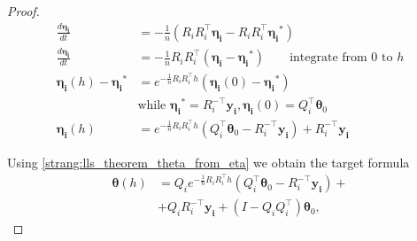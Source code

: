\documentclass{article}
\newcommand{\vect}[1]{\boldsymbol{\mathbf{#1}}}
\begin{document}
\begin{proof}
\begin{align*}
\frac{d \vect{\eta_i}}{d t} &= - \frac{1}{n} \left( R_iR_i^\top \vect{\eta_i}- R_iR_i^\top \vect{\eta_i}^*\right) \\
\frac{d \vect{\eta_i}}{d t} &= - \frac{1}{n} R_iR_i^\top \left( \vect{\eta_i}- \vect{\eta_i}^*\right) \qquad \text{integrate from $0$ to $h$} \\
\vect{\eta_i}(h) - \vect{\eta_i}^* &= e^{- \frac{1}{n} R_iR_i^\top h} (\vect{\eta_i}(0) - \vect{\eta_i}^*) \\ 
&\text{while } \vect{\eta_i}^* = R_i^{-\top}\vect{y_i}, \vect{\eta_i}(0) = Q_i^\top \vect{\theta}_0 \\
\vect{\eta_i}(h) &= e^{- \frac{1}{n} R_iR_i^\top h} (Q_i^\top \vect{\theta}_0 - R_i^{-\top}\vect{y_i}) + R_i^{-\top}\vect{y_i} 
\end{align*}

Using \eqref{strang:lls_theorem_theta_from_eta} we obtain the target formula
\begin{equation*}
\begin{split}
\vect{\theta}(h) &= Q_i e^{-\frac{1}{n}R_iR_i^\top h} \left( Q_i^\top \vect{\theta}_0 - R_i^{-\top}\vect{y_i}\right) + \\ &+ Q_iR_i^{-\top}\vect{y_i} + (I - Q_iQ_i^\top)\vect{\theta}_0,
\end{split}
\end{equation*}

\end{proof}
\end{document}
